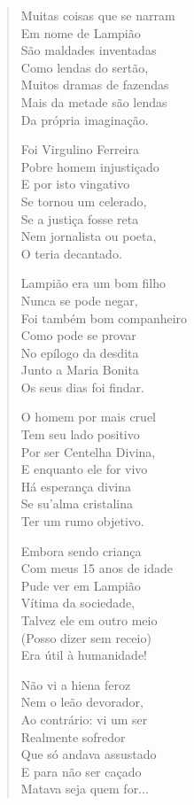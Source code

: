 \begin{verse}
Muitas coisas que se narram \\
Em nome de Lampião \\
São maldades inventadas \\
Como lendas do sertão, \\
Muitos dramas de fazendas \\
Mais da metade são lendas \\
Da própria imaginação. 

Foi Virgulino Ferreira \\
Pobre homem injustiçado \\
E por isto vingativo \\
Se tornou um celerado, \\
Se a justiça fosse reta \\
Nem jornalista ou poeta, \\
O teria decantado. 

Lampião era um bom filho \\
Nunca se pode negar, \\
Foi também bom companheiro \\
Como pode se provar \\
No epílogo da desdita \\
Junto a Maria Bonita \\
Os seus dias foi findar. 
\pagebreak

O homem por mais cruel \\
Tem seu lado positivo \\
Por ser Centelha Divina, \\
E enquanto ele for vivo \\
Há esperança divina \\
Se su'alma cristalina \\
Ter um rumo objetivo. 

Embora sendo criança \\
Com meus 15 anos de idade \\
Pude ver em Lampião \\
Vítima da sociedade, \\
Talvez ele em outro meio \\
(Posso dizer sem receio) \\
Era útil à humanidade! 

Não vi a hiena feroz \\
Nem o leão devorador, \\
Ao contrário: vi um ser \\
Realmente sofredor \\
Que só andava assustado \\
E para não ser caçado \\
Matava seja quem for... 


\end{verse}
